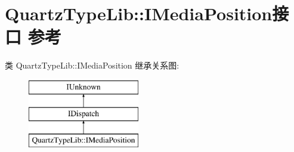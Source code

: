\hypertarget{interface_quartz_type_lib_1_1_i_media_position}{}\section{Quartz\+Type\+Lib\+:\+:I\+Media\+Position接口 参考}
\label{interface_quartz_type_lib_1_1_i_media_position}
类 Quartz\+Type\+Lib\+:\+:I\+Media\+Position 继承关系图\+:\begin{figure}[H]
\begin{center}
\leavevmode
\includegraphics[height=3.000000cm]{interface_quartz_type_lib_1_1_i_media_position}
\end{center}
\end{figure}
